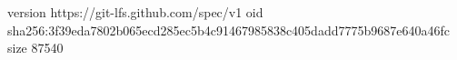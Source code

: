 version https://git-lfs.github.com/spec/v1
oid sha256:3f39eda7802b065ecd285ec5b4c91467985838c405dadd7775b9687e640a46fc
size 87540
